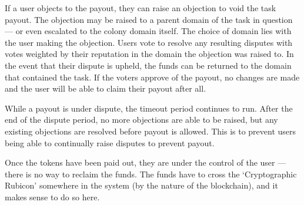 If a user objects to the payout, they can raise an objection to void the task payout. The objection may be raised to a parent domain of the task in question --- or even escalated to the colony domain itself. The choice of domain lies with the user making the objection. Users vote to resolve any resulting disputes with votes weighted by their reputation in the domain the objection was raised to. In the event that their dispute is upheld, the funds can be returned to the domain that contained the task. If the voters approve of the payout, no changes are made and the user will be able to claim their payout after all.

While a payout is under dispute, the timeout period continues to run. After the end of the dispute period, no more objections are able to be raised, but any existing objections are resolved before payout is allowed.  This is to prevent users being able to continually raise disputes to prevent payout.

Once the tokens have been paid out, they are under the control of the user --- there is no way to reclaim the funds. The funds have to cross the `Cryptographic Rubicon' somewhere in the system (by the nature of the blockchain), and it makes sense to do so here.
